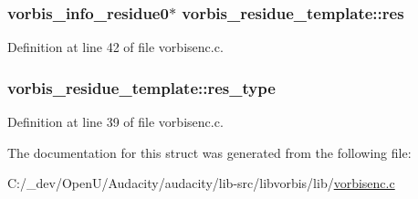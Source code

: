 \subsubsection[{\texorpdfstring{res}{res}}]{ {\bf vorbis\+\_\+info\+\_\+residue0}$\ast$ vorbis\+\_\+residue\+\_\+template\+::res}\hypertarget{structvorbis__residue__template_a7b4e0d90fa41a67a95513cfae4adec59}{}\label{structvorbis__residue__template_a7b4e0d90fa41a67a95513cfae4adec59}


Definition at line 42 of file vorbisenc.\+c.

\subsubsection[{\texorpdfstring{res\+\_\+type}{res_type}}]{ vorbis\+\_\+residue\+\_\+template\+::res\+\_\+type}\hypertarget{structvorbis__residue__template_a15084c4bd97066e1bf874f93e41db0ea}{}\label{structvorbis__residue__template_a15084c4bd97066e1bf874f93e41db0ea}


Definition at line 39 of file vorbisenc.\+c.



The documentation for this struct was generated from the following file\+:\begin{DoxyCompactItemize}
\item 
C\+:/\+\_\+dev/\+Open\+U/\+Audacity/audacity/lib-\/src/libvorbis/lib/\hyperlink{vorbisenc_8c}{vorbisenc.\+c}\end{DoxyCompactItemize}
